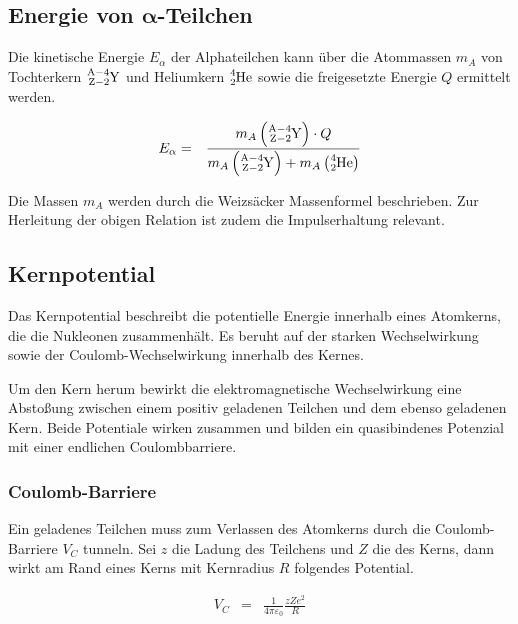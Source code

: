 \documentclass[12pt,a4paper]{scrartcl}
\numberwithin{equation}{section} %
\renewcommand{\[}{} %
\renewcommand{\]}{\noindent} %
\begin{document}
\hypertarget{energie-von-pmbalpha-teilchen}{%
\subsection{\texorpdfstring{Energie von
$\pmb{\alpha}$-Teilchen}{Energie von \textbackslash pmb\{\textbackslash alpha\}-Teilchen}}\label{energie-von-pmbalpha-teilchen}}

Die kinetische Energie $E_\alpha$ der Alphateilchen kann über die
Atommassen $m_A$ von Tochterkern $\ce{^{A-4}_{Z-2}Y}$ und Heliumkern
$\ce{^4_2He}$ sowie die freigesetzte Energie $Q$ ermittelt werden.

\[
\begin{eqnarray}
        E_\alpha
                &=& \frac{m_{A}\left(\ce{^{A-4}_{Z-2}Y}\right) \cdot Q}
                        {m_{A}\left(\ce{^{A-4}_{Z-2}Y}\right)+m_{A}\left(\ce{^4_2He}\right)}
\end{eqnarray}
\]

Die Massen $m_A$ werden durch die Weizsäcker Massenformel beschrieben.
Zur Herleitung der obigen Relation ist zudem die Impulserhaltung
relevant.

\hypertarget{kernpotential}{%
\subsection{Kernpotential}\label{kernpotential}}

Das Kernpotential beschreibt die potentielle Energie innerhalb eines
Atomkerns, die die Nukleonen zusammenhält. Es beruht auf der starken
Wechselwirkung sowie der Coulomb-Wechselwirkung innerhalb des Kernes.

Um den Kern herum bewirkt die elektromagnetische Wechselwirkung eine
Abstoßung zwischen einem positiv geladenen Teilchen und dem ebenso
geladenen Kern. Beide Potentiale wirken zusammen und bilden ein
quasibindenes Potenzial mit einer endlichen Coulombbarriere.

\hypertarget{coulomb-barriere}{%
\subsubsection{Coulomb-Barriere}\label{coulomb-barriere}}

Ein geladenes Teilchen muss zum Verlassen des Atomkerns durch die
Coulomb-Barriere $V_C$ tunneln. Sei $z$ die Ladung des Teilchens und
$Z$ die des Kerns, dann wirkt am Rand eines Kerns mit Kernradius $R$
folgendes Potential.

\[
\begin{eqnarray}
    V_C &=& \frac{1}{4\pi\varepsilon_0} \frac{zZe^2}{R}
\end{eqnarray}
\]
\end{document}
